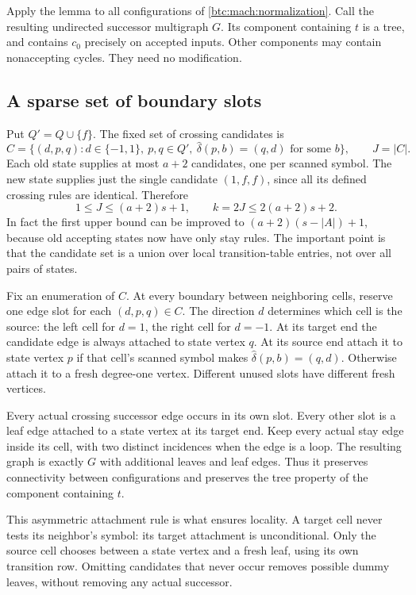 Apply the lemma to all configurations of \eqref{btc:mach:normalization}.
Call the resulting undirected successor multigraph $G$. Its component
containing $t$ is a tree, and contains $c_0$ precisely on accepted
inputs. Other components may contain nonaccepting cycles. They need no
modification.

\subsection{A sparse set of boundary slots}

Put $Q'=Q\cup\{f\}$. The fixed set of crossing candidates is
\begin{equation}\label{btc:mach:slot-set}
 C=\{(d,p,q):d\in\{-1,1\},\ p,q\in Q',\
       \widehat\delta(p,b)=(q,d)\text{ for some }b\},
 \qquad J=|C|.
\end{equation}
Each old state supplies at most $a+2$ candidates, one per scanned symbol.
The new state supplies just the single candidate $(1,f,f)$, since all
its defined crossing rules are identical. Therefore
\begin{equation}\label{btc:mach:slot-count}
 1\le J\le(a+2)s+1,\qquad k=2J\le2(a+2)s+2.
\end{equation}
In fact the first upper bound can be improved to
$(a+2)(s-|A|)+1$, because old accepting states now have only stay rules.
The important point is that the candidate set is a union over local
transition-table entries, not over all pairs of states.

Fix an enumeration of $C$. At every boundary between neighboring cells,
reserve one edge slot for each $(d,p,q)\in C$. The direction $d$
determines which cell is the source: the left cell for $d=1$, the right
cell for $d=-1$. At its target end the candidate edge is always attached
to state vertex $q$. At its source end attach it to state vertex $p$
if that cell's scanned symbol makes $\widehat\delta(p,b)=(q,d)$.
Otherwise attach it to a fresh degree-one vertex. Different unused
slots have different fresh vertices.

Every actual crossing successor edge occurs in its own slot. Every
other slot is a leaf edge attached to a state vertex at its target end.
Keep every actual stay edge inside its cell, with two distinct
incidences when the edge is a loop. The resulting graph is exactly $G$
with additional leaves and leaf edges. Thus it preserves connectivity
between configurations and preserves the tree property of the component
containing $t$.

This asymmetric attachment rule is what ensures locality. A target cell
never tests its neighbor's symbol: its target attachment is unconditional.
Only the source cell chooses between a state vertex and a fresh leaf,
using its own transition row. Omitting candidates that never occur
removes possible dummy leaves, without removing any actual successor.

